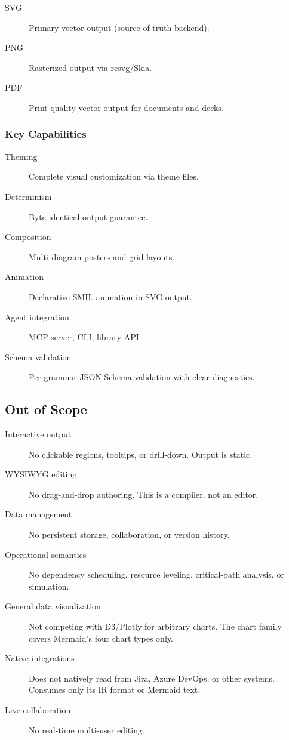\begin{description}
  \item[SVG] Primary vector output (source-of-truth backend).
  \item[PNG] Rasterized output via resvg/Skia.
  \item[PDF] Print-quality vector output for documents and decks.
\end{description}

\subsubsection{Key Capabilities}

\begin{description}
  \item[Theming] Complete visual customization via theme files.
  \item[Determinism] Byte-identical output guarantee.
  \item[Composition] Multi-diagram posters and grid layouts.
  \item[Animation] Declarative SMIL animation in SVG output.
  \item[Agent integration] MCP server, CLI, library API.
  \item[Schema validation] Per-grammar JSON Schema validation with clear diagnostics.
\end{description}

\subsection{Out of Scope}

\begin{description}
  \item[Interactive output] No clickable regions, tooltips, or drill-down. Output is static.
  \item[WYSIWYG editing] No drag-and-drop authoring. This is a compiler, not an editor.
  \item[Data management] No persistent storage, collaboration, or version history.
  \item[Operational semantics] No dependency scheduling, resource leveling, critical-path
        analysis, or simulation.
  \item[General data visualization] Not competing with D3/Plotly for arbitrary charts.
        The chart family covers Mermaid's four chart types only.
  \item[Native integrations] Does not natively read from Jira, Azure DevOps, or other
        systems. Consumes only its IR format or Mermaid text.
  \item[Live collaboration] No real-time multi-user editing.
\end{description}

